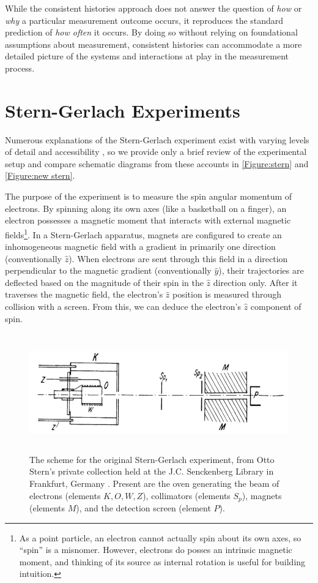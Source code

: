 While the consistent histories approach does not answer the question of \textit{how} or \textit{why} a particular measurement outcome occurs, it reproduces the standard prediction of \textit{how often} it occurs. By doing so without relying on foundational assumptions about measurement, consistent histories can accommodate a more detailed picture of the systems and interactions at play in the measurement process.


\chapter{Stern-Gerlach Experiments}
Numerous explanations of the Stern-Gerlach experiment exist with varying levels of detail and accessibility \cite{mcintyre, bocking, rodriguez, stern}, so we provide only a brief review of the experimental setup and compare schematic diagrams from these accounts in  \autoref{Figure:stern} and \autoref{Figure:new stern}.

The purpose of the experiment is to measure the spin angular momentum of electrons. By spinning along its own axes (like a basketball on a finger), an electron possesses a magnetic moment that interacts with external magnetic fields\footnote{As a point particle, an electron cannot actually spin about its own axes, so ``spin'' is a misnomer. However, electrons do posses an intrinsic magnetic moment, and thinking of its source as internal rotation is useful for building intuition.}. In a Stern-Gerlach apparatus, magnets are configured to create an inhomogeneous magnetic field with a gradient in primarily one direction (conventionally $\hat{z}$). When electrons are sent through this field in a direction perpendicular to the magnetic gradient (conventionally $\hat{y}$), their trajectories are deflected based on the magnitude of their spin in the $\hat{z}$ direction only. After it traverses the magnetic field, the electron's $\hat{z}$ position is measured through collision with a screen. From this, we can deduce the electron's $\hat{z}$ component of spin.

\begin{figure}[!tb]
\centering\CaptionFontSize
\includegraphics[height=2.0in]
{Figure-stern}
\caption[Otto Stern's scheme for the original Stern-Gerlach experiment]
  {The scheme for the original Stern-Gerlach experiment, from Otto Stern's private collection held at the J.C. Senckenberg Library in Frankfurt, Germany \cite{bocking}. Present are the oven generating the beam of electrons (elements $K,O,W,Z$), collimators (elements $S_p$), magnets (elements $M$), and the detection screen (element $P$).}
\label{Figure:stern}
\end{figure}

